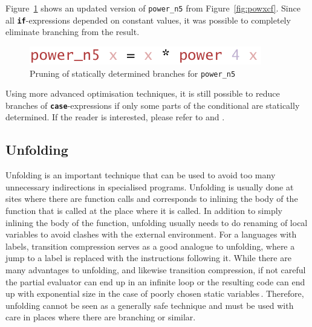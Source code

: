 \documentclass{ituthesis}
\newcommand{\ttdec}[1]{\textcolor{declared-var-color}{\texttt{#1}}}
\theoremstyle{break}
\begin{document}
Figure~\ref{fig:powxbp} shows an updated version of \ttdec{power\_n5} from Figure~\ref{fig:powxcf}.
Since all \texttt{\textbf{if}}-expressions depended on constant values, it was possible to completely eliminate branching from the result.

\begin{figure}[ht]
\begin{center}
    \includegraphics[scale=0.5]{Figures/PowerExampleBranchPruning.png}
\end{center}
\caption{Pruning of statically determined branches for \ttdec{power\_n5}}
\label{fig:powxbp}
\end{figure}

Using more advanced optimisation techniques, it is still possible to reduce branches of \texttt{\textbf{case}}-expressions if only some parts of the conditional are statically determined. If the reader is interested, please refer to \textcite{PeytonJones:1992:IFL:129390} and \textcite{boquist1999code}.

\subsection{Unfolding}
\label{sub:Unfolding}
Unfolding is an important technique that can be used to avoid too many unnecessary indirections in specialised programs.
Unfolding is usually done at sites where there are function calls and corresponds to inlining the body of the function that is called at the place where it is called.
In addition to simply inlining the body of the function, unfolding usually needs to do renaming of local variables to avoid clashes with the external environment.
For a languages with labels, transition compression serves as a good analogue to unfolding, where a jump to a label is replaced with the instructions following it.
While there are many advantages to unfolding, and likewise transition compression, if not careful the partial evaluator can end up in an infinite loop or the resulting code can end up with exponential size in the case of poorly chosen static variables\,\autocite{Jones:1993:PEA:153676}.
Therefore, unfolding cannot be seen as a generally safe technique and must be used with care in places where there are branching or similar.
\end{document}
